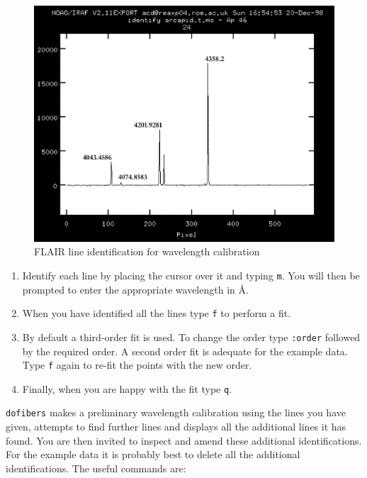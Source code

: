 \documentclass[twoside,11pt]{starlink}
\begin{document}
\begin{enumerate}
  \begin{figure}[htbp]
     \centering
     \includegraphics[totalheight=4in]{sc14_flair_wave}
     \caption{FLAIR line identification for wavelength calibration
     \label{FLAIR_WAVE} }
  \end{figure}

  \begin{enumerate}

    \item Identify each line by placing the cursor over it and
     typing \texttt{m}.  You will then be prompted to enter the
     appropriate wavelength in \AA.

    \item When you have identified all the lines type \texttt{f} to
     perform a fit.

    \item By default a third-order fit is used.  To change the order
     type \texttt{:order} followed by the required order.  A second
     order fit is adequate for the example data.  Type \texttt{f} again
     to re-fit the points with the new order.

    \item Finally, when you are happy with the fit type \texttt{q}.

  \end{enumerate}

   \texttt{dofibers} makes a preliminary wavelength calibration using the
   lines you have given, attempts to find further lines and displays
   all the additional lines it has found.  You are then invited to inspect
   and amend these additional identifications.  For the example data
   it is probably best to delete all the additional identifications.
   The useful commands are:


\end{enumerate}
\end{document}
